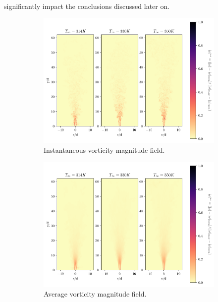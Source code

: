 significantly impact the conclusions discussed later on. 

\begin{figure}[H]
\begin{subfigure}{0.5\textwidth}
	\centering
	\includegraphics[scale=.45]{figures/Plots/vertical/magvort_scaled_vert_all.pdf}
	\caption{Instantaneous vorticity magnitude field.} \label{all_magvort_1}
\end{subfigure}
\hfill
\begin{subfigure}{0.5\textwidth}
	\centering
	\includegraphics[scale=.45]{figures/Plots/vertical/magvort_scaled_vert_avg_all.pdf}
	\caption{Average vorticity magnitude field.} \label{all_magvort_2}
\end{subfigure}
\vfill
\centering
\begin{subfigure}{0.5\textwidth}

\end{subfigure}
\end{figure}
